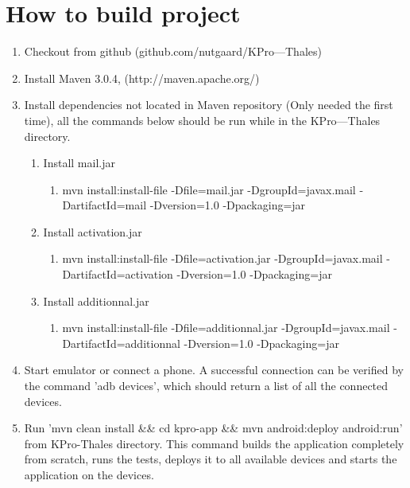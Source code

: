 \chapter{How to build project}

\begin{enumerate}
\item{}Checkout from github (github.com/nutgaard/KPro---Thales)
\item{}Install Maven 3.0.4, (http://maven.apache.org/)
\item{}Install dependencies not located in Maven repository (Only needed the first time), all the commands below should be run while in the KPro---Thales directory.
\begin{enumerate}
\item{}Install mail.jar
\begin{enumerate}
\item{}mvn install:install-file -Dfile=mail.jar -DgroupId=javax.mail -DartifactId=mail -Dversion=1.0 -Dpackaging=jar
\end{enumerate}
\item{}Install activation.jar
\begin{enumerate}
\item{}mvn install:install-file -Dfile=activation.jar -DgroupId=javax.mail -DartifactId=activation -Dversion=1.0 -Dpackaging=jar
\end{enumerate}	
\item{}Install additionnal.jar
\begin{enumerate}
\item{}mvn install:install-file -Dfile=additionnal.jar -DgroupId=javax.mail -DartifactId=additionnal -Dversion=1.0 -Dpackaging=jar
\end{enumerate}
\end{enumerate}
\item{}Start emulator or connect a phone. A successful connection can be verified by the command 'adb devices', which should return a list of all the connected devices. 
\item{}Run 'mvn clean install \&\& cd kpro-app \&\& mvn android:deploy android:run' from KPro-Thales directory.
This command builds the application completely from scratch, runs the tests, deploys it to all available devices and starts the application on the devices.
\end{enumerate}
